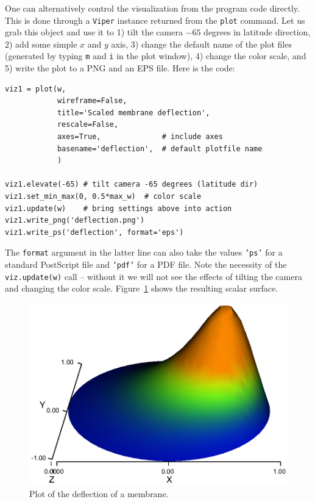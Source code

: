One can alternatively control the visualization from the program code
directly. This is done through a {\fontsize{12pt}{12pt}\texttt{Viper}} instance returned from
the {\fontsize{12pt}{12pt}\texttt{plot}} command. Let us grab this object and use it to
1) tilt the camera $-65$ degrees in latitude direction, 2) add some simple
$x$ and $y$ axis, 3) change the default name of the plot files (generated
by typing {\fontsize{12pt}{12pt}\texttt{m}} and {\fontsize{12pt}{12pt}\texttt{i}} in the plot window),
4) change the color scale, and 5) write the plot
to a PNG and an EPS file. Here is the code:
\begin{Verbatim}[fontsize=\fontsize{10pt}{10pt},tabsize=8,baselinestretch=1.05,
fontfamily=tt,xleftmargin=7mm]
viz1 = plot(w,
            wireframe=False,
            title='Scaled membrane deflection',
            rescale=False,
            axes=True,              # include axes
            basename='deflection',  # default plotfile name
            )

viz1.elevate(-65) # tilt camera -65 degrees (latitude dir)
viz1.set_min_max(0, 0.5*max_w)  # color scale
viz1.update(w)    # bring settings above into action
viz1.write_png('deflection.png')
viz1.write_ps('deflection', format='eps')
\end{Verbatim}
\noindent
The {\fontsize{12pt}{12pt}\texttt{format}} argument in the latter line can also take the values
{\fontsize{12pt}{12pt}\texttt{'ps'}} for a standard PostScript file and {\fontsize{12pt}{12pt}\texttt{'pdf'}} for
a PDF file.
Note the necessity of the {\fontsize{12pt}{12pt}\texttt{viz.update(w)}} call -- without it we will
not see the effects of tilting the camera and changing the color scale.
Figure~\ref{langtangen:poisson:2D:fig1} shows the resulting scalar surface.
\begin{figure}
  \centerline{
   \includegraphics{chapters/langtangen/eps/membrane_waxis.eps}}
  \caption{\label{langtangen:poisson:2D:fig1}
  Plot of the deflection of a membrane.
  }
\end{figure}


